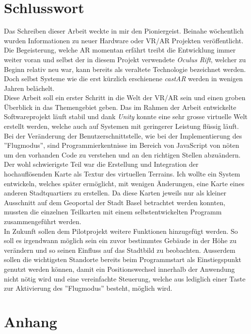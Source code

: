 \chapter{Schlusswort}\label{c.zusammenfassung}
\vspace{-20pt}
Das Schreiben dieser Arbeit weckte in mir den Pioniergeist. Beinahe wöchentlich wurden Informationen zu neuer Hardware oder VR/AR Projekten veröffentlicht. Die Begeisterung, welche AR momentan erfährt treibt die Entwicklung immer weiter voran und selbst der in diesem Projekt verwendete \textit{Oculus Rift}, welcher zu Beginn relativ neu war, kann bereits als veraltete Technologie bezeichnet werden. Doch selbst Systeme wie die erst kürzlich erschienene \textit{castAR} werden in wenigen Jahren belächelt.\\[6pt] 
Diese Arbeit soll ein erster Schritt in die Welt der VR/AR sein und einen groben Überblick in das Themengebiet geben. Das im Rahmen der Arbeit entwickelte Softwareprojekt läuft stabil und dank \textit{Unity} konnte eine sehr grosse virtuelle Welt erstellt werden, welche auch auf Systemen mit geringerer Leistung flüssig läuft. Bei der Veränderung der Benutzerschnittstelle, wie bei der Implementierung des ''Flugmodus'', sind Programmierkentnisse im Bereich von JavaScript von nöten um den vorhanden Code zu verstehen und an den richtigen Stellen abzuändern. Der wohl schwierigste Teil war die Erstellung und Integration der hochauflösenden Karte als Textur des virtuellen Terrains. Ich wollte ein System entwickeln, welches später ermöglicht, mit wenigen Änderungen, eine Karte eines anderen Stadtquartiers zu erstellen. Da diese Karten jeweils nur als kleiner Ausschnitt auf dem Geoportal der Stadt Basel betrachtet werden konnten, mussten die einzelnen Teilkarten mit einem selbstentwickelten Programm zusammengeführt werden.\\[6pt]
\newpage
 In Zukunft sollen dem Pilotprojekt weitere Funktionen hinzugefügt werden. So soll es irgendwann möglich sein ein zuvor bestimmtes Gebäude in der Höhe zu verändern und so seinen Einfluss auf das Stadtbild zu beobachten. Ausserdem sollen die wichtigsten Standorte bereits beim Programmstart als Einstiegspunkt genutzt werden können, damit ein Positionswechsel innerhalb der Anwendung nicht nötig wird und eine vereinfachte Steuerung, welche aus lediglich einer Taste zur Aktivierung des ''Flugmodus'' besteht, möglich wird.
\chapter{Anhang}\label{c.anhang}
\vspace{-20pt}
